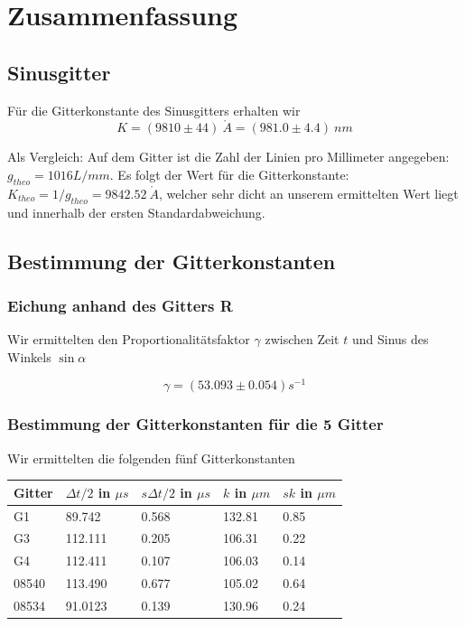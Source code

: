  \section{Zusammenfassung}

\subsection{Sinusgitter} %

Für die Gitterkonstante des Sinusgitters erhalten wir
$$\boxed{K=(9810 \pm 44) \ \mathring A = (981.0 \pm 4.4) \ nm}$$

Als Vergleich: Auf dem Gitter ist die Zahl der Linien pro Millimeter angegeben: \\ $g_{theo}=1016 L/mm$. Es folgt der Wert f\"ur die Gitterkonstante: $K_{theo} = 1/g_{theo} = 9842.52 \ \mathring A$, welcher sehr dicht an unserem ermittelten Wert liegt und innerhalb der ersten Standardabweichung.

\subsection{Bestimmung der Gitterkonstanten}

\subsubsection{Eichung anhand des Gitters R}

Wir ermittelten den Proportionalitätsfaktor $\gamma$ zwischen Zeit $t$ und Sinus des Winkels $\sin \alpha$ 

$$ \gamma = (53.093 \pm 0.054) s^{-1} $$


\subsubsection{Bestimmung der Gitterkonstanten f\"ur die 5 Gitter}

Wir ermittelten die folgenden fünf Gitterkonstanten
\begin{center}
\begin{tabular}{lllll}
\toprule 
Gitter & $\Delta t /2$ in $\mu s$ & $s\Delta t /2$ in $\mu s$ & $k$ in $\mu m$ & $sk$ in $\mu m$\\
\midrule
G1 & 89.742 & 0.568 & 132.81 & 0.85\\
G3 & 112.111 & 0.205 & 106.31 & 0.22\\
G4 & 112.411 & 0.107 & 106.03 & 0.14\\
08540 & 113.490 & 0.677 & 105.02 & 0.64\\
08534 & 91.0123 & 0.139 & 130.96 & 0.24\\
\bottomrule
\end{tabular} 
\end{center}

